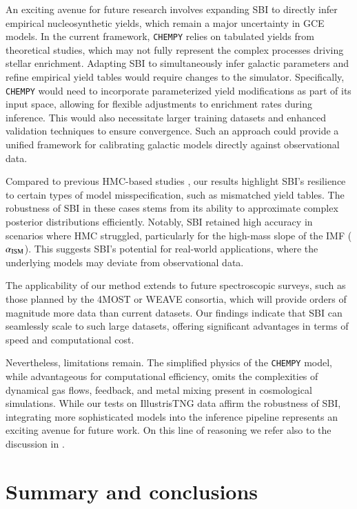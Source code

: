 \documentclass{aa}
\begin{document}
An exciting avenue for future research involves expanding SBI to directly infer empirical nucleosynthetic yields, which remain a major uncertainty in GCE models. In the current framework, \texttt{CHEMPY} relies on tabulated yields from theoretical studies, which may not fully represent the complex processes driving stellar enrichment. Adapting SBI to simultaneously infer galactic parameters and refine empirical yield tables would require changes to the simulator. Specifically, \texttt{CHEMPY} would need to incorporate parameterized yield modifications as part of its input space, allowing for flexible adjustments to enrichment rates during inference. This would also necessitate larger training datasets and enhanced validation techniques to ensure convergence. Such an approach could provide a unified framework for calibrating galactic models directly against observational data.

Compared to previous HMC-based studies \citep[e.g.][]{Philcox_2019}, our results highlight SBI's resilience to certain types of model misspecification, such as mismatched yield tables. The robustness of SBI in these cases stems from its ability to approximate complex posterior distributions efficiently. Notably, SBI retained high accuracy in scenarios where HMC struggled, particularly for the high-mass slope of the IMF ($\alpha_{\rm ISM}$). This suggests SBI's potential for real-world applications, where the underlying models may deviate from observational data.

The applicability of our method extends to future spectroscopic surveys, such as those planned by the 4MOST or WEAVE consortia, which will provide orders of magnitude more data than current datasets. Our findings indicate that SBI can seamlessly scale to such large datasets, offering significant advantages in terms of speed and computational cost.

Nevertheless, limitations remain. The simplified physics of the \texttt{CHEMPY} model, while advantageous for computational efficiency, omits the complexities of dynamical gas flows, feedback, and metal mixing present in cosmological simulations. While our tests on IllustrisTNG data affirm the robustness of SBI, integrating more sophisticated models into the inference pipeline represents an exciting avenue for future work. On this line of reasoning we refer also to the discussion in \citet{Philcox_2019}.

\section{Summary and conclusions}
\label{sec: conclusion}
\end{document}
